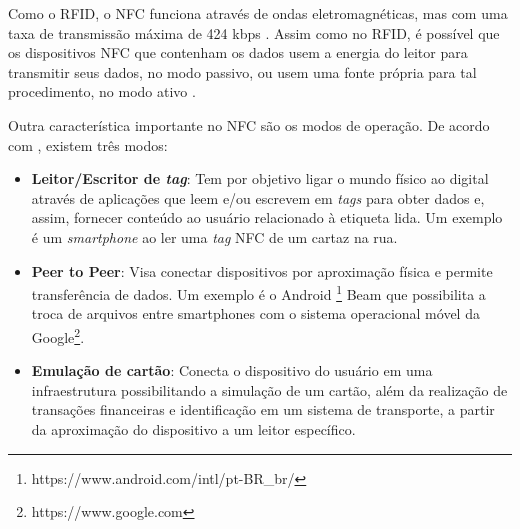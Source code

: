 Como o RFID, o NFC funciona através de ondas eletromagnéticas, mas com uma taxa de transmissão máxima de 424 kbps \cite{NFCForum2016}. Assim como no RFID, é possível que os dispositivos NFC que contenham os dados usem a energia do leitor para transmitir seus dados, no modo passivo, ou usem uma fonte própria para tal procedimento, no modo ativo \cite{Igoe2014}.


Outra característica importante no NFC são os modos de operação. De acordo com , existem três modos:

\begin{itemize}[noitemsep,topsep=5pt]
	\item \textbf{Leitor/Escritor de \textit{tag}}: Tem por objetivo ligar o mundo físico ao digital através de aplicações que leem e/ou escrevem em \textit{tags} para obter dados e, assim, fornecer conteúdo ao usuário relacionado à etiqueta lida. Um exemplo é um \textit{smartphone} ao ler uma \textit{tag} NFC de um cartaz na rua.
	\item \textbf{Peer to Peer}: Visa conectar dispositivos por aproximação física e permite transferência de dados. Um exemplo é o Android \textsuperscript{\textregistered}\footnote{https://www.android.com/intl/pt-BR\_br/} Beam que possibilita a troca de arquivos entre smartphones com o 
	sistema operacional móvel da Google\textsuperscript{\textregistered}\footnote{https://www.google.com}.
	\item \textbf{Emulação de cartão}: Conecta o dispositivo do usuário em uma infraestrutura possibilitando a simulação de um cartão, além da realização de transações financeiras e identificação em um sistema de transporte, a partir da aproximação do dispositivo a um leitor 	específico.
\end{itemize}



